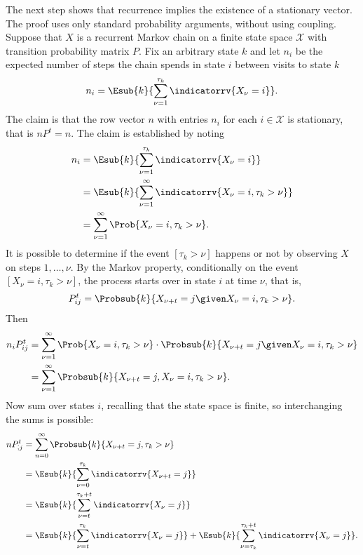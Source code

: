 \documentclass[12pt]{article}
\begin{document}
    The next step shows that recurrence implies the existence of a
    stationary vector.  The proof uses only standard probability
    arguments, without using coupling.  Suppose that \( X \) is a
    recurrent Markov chain on a finite state space \( \mathcal{X} \)
    with transition probability matrix \( P \).  Fix an arbitrary state \(
    k \) and let \( n_{i} \) be the expected number of steps the chain
    spends in state \( i \) between visits to state \( k \)
    \[
        n_i = \Esub{k}{\sum\limits_{\nu=1}^{\tau_k} \indicatorrv{X_{\nu} =
        i}}.
    \] The claim is that the row vector \( n \) with entries \( n_i \)
    for each \( i \in \mathcal{X} \) is stationary, that is \( nP^t = n \).
    The claim is established by noting
    \begin{align*}
        n_i &= \Esub{k}{\sum\limits_{\nu=1}^{\tau_k} \indicatorrv{X_{\nu}
        = i}}\\
        &= \Esub{k}{\sum\limits_{\nu=1}^{\infty} \indicatorrv{X_{\nu} = i,
        \tau_k > \nu}} \\
        &= \sum\limits_{\nu=1}^{\infty} \Prob{X_{\nu} = i, \tau_k > \nu}.
    \end{align*}
    It is possible to determine if the event \( [\tau_k > \nu] \)
    happens or not by observing \( X \) on steps \( 1, \dots, \nu \).
    By the Markov property, conditionally on the event \( [X_{\nu} = i,
    \tau_k > \nu] \), the process starts over in state \( i \) at time \(
    \nu \), that is,
    \[
        P_{ij}^t = \Probsub{k}{X_{\nu + t} = j \given X_{\nu} = i, \tau_k
        > \nu}.
    \] Then
    \begin{align*}
        n_i P_{ij}^t &= {\sum\limits_{\nu=1}^{\infty} \Prob{X_{\nu} = i,
        \tau_k > \nu}} \cdot \Probsub{k}{X_{\nu + t} = j \given X_{\nu}
        = i, \tau_k > \nu} \\
        &= \sum\limits_{\nu=1}^{\infty} \Probsub{k}{X_{\nu+t} = j, X_\nu=
        i, \tau_k > \nu}.
    \end{align*}
    Now sum over states \( i \), recalling that the state space is
    finite, so interchanging the sums is possible:
    \begin{align*}
        n P_{\dot,j}^{t} &=\sum\limits_{n=0}^{\infty} \Probsub{k}{X_{\nu+t}
        = j, \tau_k > \nu} \\
        &=\Esub{k}{\sum\limits_{\nu=0}^{\tau_k} \indicatorrv{X_{\nu+t} = j}}
        \\
        &= \Esub{k}{\sum\limits_{\nu=t}^{\tau_k + t} \indicatorrv{X_{\nu}
        = j}} \\
        &= \Esub{k}{\sum\limits_{\nu=t}^{\tau_k } \indicatorrv{X_{\nu} = j}}
        + \Esub{k}{\sum\limits_{\nu=\tau_k}^{\tau_k +t} \indicatorrv{X_{\nu}
        = j}}.
    \end{align*}
\end{document}
